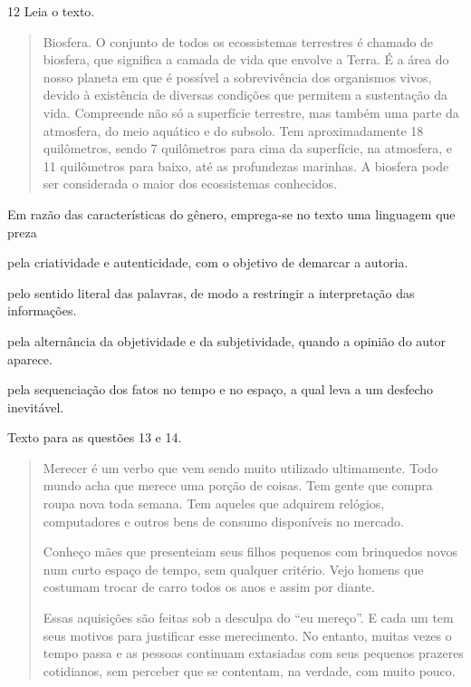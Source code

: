 \num{12} Leia o texto.

\begin{quote}
Biosfera. O conjunto de todos os ecossistemas terrestres é chamado de
biosfera, que significa a camada de vida que envolve a Terra. É a área
do nosso planeta em que é possível a sobrevivência dos organismos vivos,
devido à existência de diversas condições que permitem a sustentação da
vida. Compreende não só a superfície terrestre, mas também uma parte da
atmosfera, do meio aquático e do subsolo. Tem aproximadamente 18
quilômetros, sendo 7 quilômetros para cima da superfície, na atmosfera,
e 11 quilômetros para baixo, até as profundezas marinhas. A biosfera
pode ser considerada o maior dos ecossistemas conhecidos.

\end{quote}

Em razão das características do gênero, emprega-se no texto uma
linguagem que preza

\begin{escolha}
\item pela criatividade e autenticidade, com o objetivo de demarcar a autoria.

\item pelo sentido literal das palavras, de modo a restringir a interpretação
das informações.

\item pela alternância da objetividade e da subjetividade, quando a opinião do
autor aparece.

\item pela sequenciação dos fatos no tempo e no espaço, a qual leva a um
desfecho inevitável.
\end{escolha}


Texto para as questões 13 e 14.

\begin{quote}
Merecer é um verbo que vem sendo muito utilizado ultimamente. Todo mundo
acha que merece uma porção de coisas. Tem gente que compra roupa nova
toda semana. Tem aqueles que adquirem relógios, computadores e outros
bens de consumo disponíveis no mercado.

Conheço mães que presenteiam seus filhos pequenos com brinquedos novos
num curto espaço de tempo, sem qualquer critério. Vejo homens que
costumam trocar de carro todos os anos e assim por diante.

Essas aquisições são feitas sob a desculpa do ``eu mereço''. E cada um
tem seus motivos para justificar esse merecimento. No entanto, muitas
vezes o tempo passa e as pessoas continuam extasiadas com seus pequenos
prazeres cotidianos, sem perceber que se contentam, na verdade, com
muito pouco.

\end{quote}

